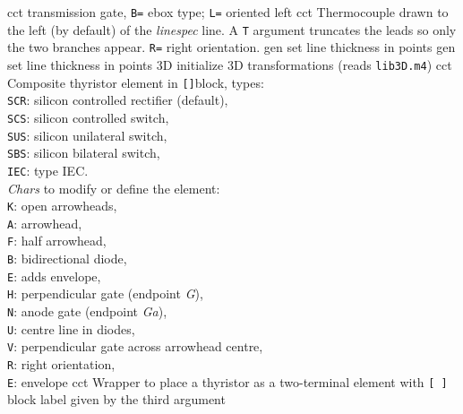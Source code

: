   {cct}%
  {transmission gate, {\tt B=} ebox type; {\tt L=} oriented left
    }%
%
  {cct}%
  { Thermocouple drawn to the left (by default) of the
    {\sl linespec} line.  A {\tt T} argument truncates the leads so
    only the two branches appear.  {\tt R=} right orientation.
    }%
%
  {gen}%
  {set line thickness in points}%
%
  {gen}%
  {set line thickness in points}%
%
  {3D} {initialize 3D transformations (reads {\tt lib3D.m4})}%
%
  {cct}%
  {Composite thyristor element in {\tt []}block, types:\\
                     {\tt SCR}: silicon controlled rectifier (default),\\
                     {\tt SCS}: silicon controlled switch,\\
                     {\tt SUS}: silicon unilateral switch,\\
                     {\tt SBS}: silicon bilateral switch,\\
                     {\tt IEC}: type IEC.\\
   {\sl Chars} to modify or define the element:\\
                     {\tt K}: open arrowheads,\\
                     {\tt A}: arrowhead,\\
                     {\tt F}: half arrowhead,\\
                     {\tt B}: bidirectional diode,\\
                     {\tt E}: adds envelope,\\
                     {\tt H}: perpendicular gate (endpoint {\sl G}),\\
                     {\tt N}: anode gate (endpoint {\sl Ga}),\\
                     {\tt U}: centre line in diodes,\\
                     {\tt V}: perpendicular gate across arrowhead centre,\\
                     {\tt R}: right orientation,\\
                     {\tt E}: envelope
    }%
%
  {cct}%
  {Wrapper to place a thyristor as a two-terminal element with
   {\tt [ ]} block label given by the third argument
    }%
